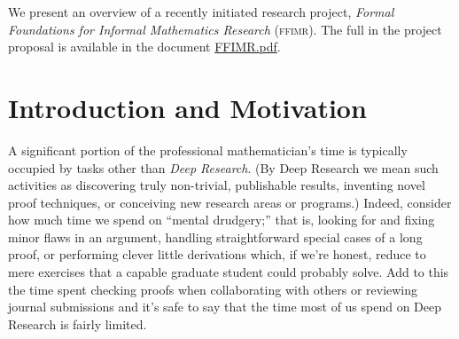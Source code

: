 \documentclass[11pt]{amsart}  %
\title[Formal Foundations for Informal Mathematics]{\workingtitle}
\begin{document}
\maketitle

We present an overview of a recently initiated research project, \textit{Formal Foundations for Informal Mathematics Research} (\textsc{ffimr}). The full in the project proposal is available in the document \href{https://github.com/williamdemeo/job-app/blob/master/research/FFIMR.pdf}{FFIMR.pdf}.

\bigskip


\section{Introduction and Motivation}
A significant portion of the professional mathematician's time is typically occupied by tasks other than \textit{Deep Research}. (By Deep Research we mean such activities as discovering truly non-trivial, publishable results, inventing novel proof techniques, or conceiving new research areas or programs.) Indeed, consider how much time we spend on ``mental drudgery;'' that is, looking for and fixing minor flaws in an argument, handling straightforward special cases of a long proof, or performing clever little derivations which, if we're honest, reduce to mere exercises that a capable graduate student could probably solve.  Add to this the time spent checking proofs when collaborating with others or reviewing journal submissions and it's safe to say that the time most of us spend on Deep Research is fairly limited.
\end{document}

